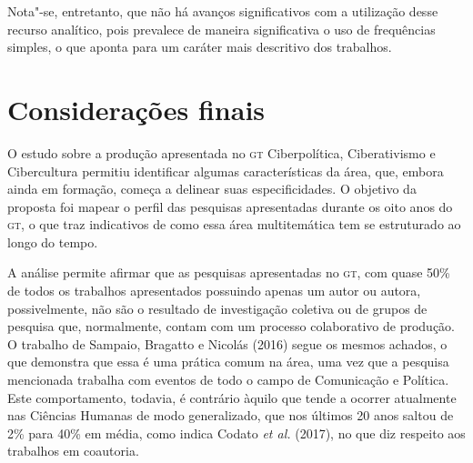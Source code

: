 Nota"-se, entretanto, que não há avanços significativos com a utilização
desse recurso analítico, pois prevalece de maneira significativa o uso
de frequências simples, o que aponta para um caráter mais descritivo dos
trabalhos.

\section{Considerações finais}

O estudo sobre a produção apresentada no \textsc{gt} Ciberpolítica, Ciberativismo
e Cibercultura permitiu identificar algumas características da área,
que, embora ainda em formação, começa a delinear suas especificidades. O
objetivo da proposta foi mapear o perfil das pesquisas apresentadas
durante os oito anos do \textsc{gt}, o que traz indicativos de como essa área
multitemática tem se estruturado ao longo do tempo.

A análise permite afirmar que as pesquisas apresentadas no \textsc{gt}, com quase
50\% de todos os trabalhos apresentados possuindo apenas um autor ou
autora, possivelmente, não são o resultado de investigação coletiva ou
de grupos de pesquisa que, normalmente, contam com um processo
colaborativo de produção. O trabalho de Sampaio, Bragatto e Nicolás
(2016) segue os mesmos achados, o que demonstra que essa é uma prática
comum na área, uma vez que a pesquisa mencionada trabalha com eventos de
todo o campo de Comunicação e Política. Este comportamento, todavia, é
contrário àquilo que tende a ocorrer atualmente nas Ciências Humanas de
modo generalizado, que nos últimos 20 anos saltou de 2\% para 40\% em
média, como indica Codato \emph{et al.} (2017), no que diz respeito aos
trabalhos em coautoria.

